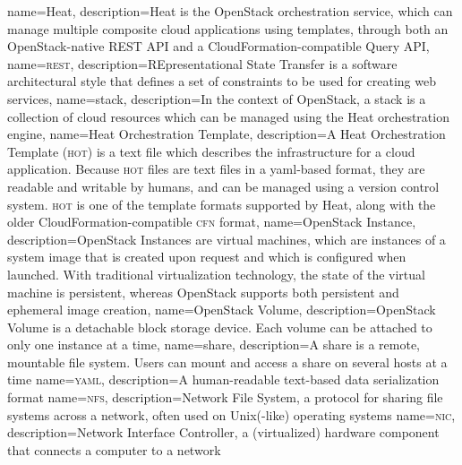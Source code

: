 {
  name={Heat},
  description={Heat is the OpenStack orchestration service, which can
  manage multiple composite cloud applications using templates,
  through both an OpenStack-native \gls{REST} API and a
  CloudFormation-compatible Query API},
}
{
  name={\textsc{rest}},
  description={REpresentational State Transfer is a software
  architectural style that defines a set of constraints to be used for
  creating web services},
}
{
  name={stack},
  description={In the context of \gls{OpenStack}, a stack is a
  collection of cloud resources which can be managed using the
  \gls{Heat} orchestration engine},
}
{
  name={Heat Orchestration Template},
  description={A \gls{Heat} Orchestration Template (\textsc{hot}) is a text
  file which describes the infrastructure for a cloud application.
  Because \textsc{hot} files are text files in a \gls{yaml}-based format, they
  are readable and writable by humans, and can be managed using a
  version control system.  \textsc{hot} is one of the template formats
  supported by Heat, along with the older CloudFormation-compatible
  \textsc{cfn} format},
}
{
  name={OpenStack Instance},
  description={OpenStack Instances are virtual machines, which are
  instances of a system image that is created upon request and which
  is configured when launched. With traditional virtualization
  technology, the state of the virtual machine is persistent, whereas
  OpenStack supports both persistent and ephemeral image creation},
}
{
  name={OpenStack Volume},
  description={OpenStack Volume is a detachable block storage device.
  Each volume can be attached to only one instance at a time},
}
{
  name={share},
  description={A share is a remote, mountable file system. Users can
  mount and access a share on several hosts at a time}
}
{
  name={\textsc{yaml}},
  description={A human-readable text-based data serialization
  format}
}
{
  name={\textsc{nfs}},
  description={Network File System, a protocol for sharing file
    systems across a network, often used on Unix(-like) operating
    systems}
}
{
  name={\textsc{nic}},
  description={Network Interface Controller, a (virtualized)
    hardware component that connects a computer to a network}
}
